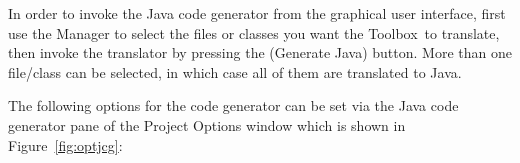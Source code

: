 \documentclass[\pformat,12pt]{article}
\newcommand{\Toolbox}{Toolbox}
\newcommand{\guicmd}[1]{{\sf #1}}
\begin{document}
In order to invoke the Java code generator from the graphical user
interface, first use the \guicmd{Manager} to select the files or
classes you want
the \Toolbox\ to translate, then invoke the translator by pressing the 
(\guicmd{Generate Java}) button. More than one file/class can be
selected, in which case all of them are translated to Java.

The following options for the code generator can be set via the
\guicmd{Java code generator} pane of the \guicmd{Project Options} window
which is shown in Figure~\ref{fig:optjcg}:


\begin{description}


\end{description}
\end{document}
